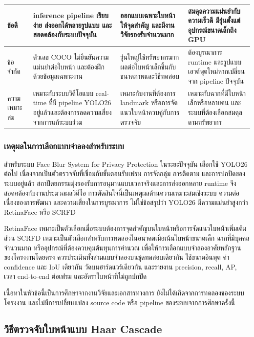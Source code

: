 {\begin{longtable}{|>{\raggedright\arraybackslash}p{}|>{\raggedright\arraybackslash}p{}|>{\raggedright\arraybackslash}p{}|>{\raggedright\arraybackslash}p{}|}
\hline
ข้อดี & inference pipeline เรียบง่าย ส่งออกได้หลายรูปแบบ และสอดคล้องกับระบบปัจจุบัน & ออกแบบเฉพาะใบหน้า ให้จุดสำคัญ และมีงานวิจัยรองรับจำนวนมาก & สมดุลความแม่นยำกับความเร็วดี มีรุ่นตั้งแต่อุปกรณ์ขนาดเล็กถึง GPU \\
\hline
ข้อจำกัด & ตัวเลข COCO ไม่ยืนยันความแม่นยำต่อใบหน้า และต้องฝึกด้วยข้อมูลเฉพาะงาน & รุ่นใหญ่ใช้ทรัพยากรมาก ผลต่อใบหน้าเล็กขึ้นกับขนาดภาพและวิธีทดสอบ & ต้องบูรณาการ runtime และรูปแบบเอาต์พุตใหม่หากเปลี่ยนจาก pipeline ปัจจุบัน \\
\hline
ความเหมาะสม & เหมาะกับระบบวิดีโอแบบ real-time ที่มี pipeline YOLO26 อยู่แล้วและต้องการลดความเสี่ยงจากการแก้ระบบร่วม & เหมาะกับงานที่ต้องการ landmark หรือการจัดแนวใบหน้าควบคู่กับการตรวจจับ & เหมาะกับฉากที่มีใบหน้าเล็กหรือหลายคน และระบบที่ต้องเลือกสมดุลตามทรัพยากร \\
\hline
\end{longtable}
}

\subsubsection{เหตุผลในการเลือกแบบจำลองสำหรับระบบ}

สำหรับระบบ Face Blur System for Privacy Protection ในระยะปัจจุบัน เลือกใช้ YOLO26 ต่อไป เนื่องจากเป็นตัวตรวจจับที่เชื่อมกับขั้นตอนรับเฟรม การจัดกลุ่ม การติดตาม และการปกปิดของระบบอยู่แล้ว สถาปัตยกรรมมุ่งรองรับการอนุมานแบบเวลาจริงและการส่งออกหลาย runtime จึงสอดคล้องกับงานประมวลผลวิดีโอ การตัดสินใจนี้เป็นเหตุผลด้านความเหมาะสมเชิงระบบ ความต่อเนื่องของการพัฒนา และความเสี่ยงในการบูรณาการ ไม่ใช่ข้อสรุปว่า YOLO26 มีความแม่นยำสูงกว่า RetinaFace หรือ SCRFD

RetinaFace เหมาะเป็นตัวเลือกเมื่อระบบต้องการจุดสำคัญบนใบหน้าหรือการจัดแนวใบหน้าเพิ่มเติม ส่วน SCRFD เหมาะเป็นตัวเลือกสำหรับการทดลองในอนาคตเมื่อเน้นใบหน้าขนาดเล็ก ฉากที่มีบุคคลจำนวนมาก หรืออุปกรณ์ที่ต้องควบคุมต้นทุนการคำนวณ เพื่อให้การเลือกแบบจำลองอาศัยหลักฐานของโครงงานโดยตรง ควรประเมินทั้งสามแบบจำลองบนชุดทดสอบเดียวกัน ใช้ขนาดอินพุต ค่า confidence และ IoU เดียวกัน วัดบนฮาร์ดแวร์เดียวกัน และรายงาน precision, recall, AP, เวลา end-to-end ต่อเฟรม และอัตราใบหน้าที่ไม่ถูกปกปิด

เนื้อหาในหัวข้อนี้เป็นการศึกษาจากงานวิจัยและเอกสารทางการ ยังไม่ได้เกิดจากการทดลองของระบบโครงงาน และไม่มีการเปลี่ยนแปลง source code หรือ pipeline ของระบบจากการศึกษาครั้งนี้

\subsection{วิธีตรวจจับใบหน้าแบบ Haar Cascade}

